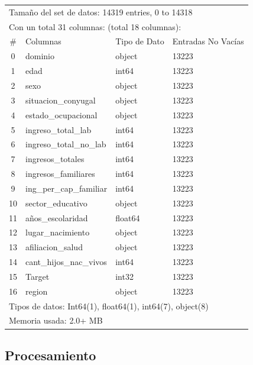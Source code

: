 \documentclass[a4paper]{article}
\begin{document}
        \begin{table}[H]
            \centering
            \begin{tabular}{clll}
                \multicolumn{4}{l}{Tamaño del set de datos: 14319 entries, 0 to 14318} \\
                \multicolumn{4}{l}{Con un total 31 columnas: (total 18 columnas):} \\
                \#  & Columnas & Tipo de Dato & Entradas No Vacías \\ \hline
                0 & dominio & object & 13223 \\ 
                1 & edad & int64 & 13223 \\ 
                2 & sexo & object & 13223 \\ 
                3 & situacion\_conyugal & object & 13223 \\ 
                4 & estado\_ocupacional & object & 13223 \\ 
                5 & ingreso\_total\_lab & int64 & 13223 \\ 
                6 & ingreso\_total\_no\_lab & int64 & 13223 \\ 
                7 & ingresos\_totales & int64 & 13223 \\ 
                8 & ingresos\_familiares & int64 & 13223 \\ 
                9 & ing\_per\_cap\_familiar & int64 & 13223 \\ 
                10 & sector\_educativo & object & 13223 \\ 
                11 & años\_escolaridad & float64 & 13223 \\ 
                12 & lugar\_nacimiento & object & 13223 \\ 
                13 & afiliacion\_salud & object & 13223 \\ 
                14 & cant\_hijos\_nac\_vivos & int64 & 13223 \\ 
                15 & Target & int32 & 13223 \\ 
                16 & region & object & 13223 \\ 
                \multicolumn{4}{l}{Tipos de datos: Int64(1), float64(1), int64(7), object(8)} \\
                \multicolumn{4}{l}{Memoria usada: 2.0+ MB} 
            \end{tabular}
        \end{table}
    \subsection{Procesamiento}
\end{document}
